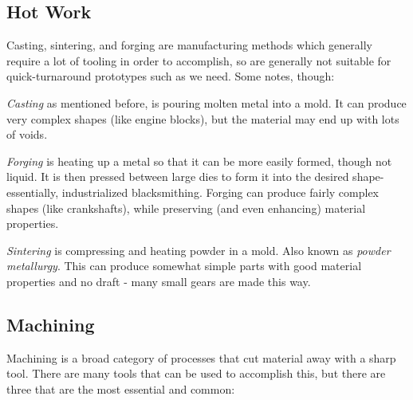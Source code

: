  \subsection{Hot Work}
 
 Casting, sintering, and forging are manufacturing methods which generally require a lot of tooling in order to accomplish, so are generally not suitable for quick-turnaround prototypes such as we need. Some notes, though:
 
 \begin{asparaitem}
 	\item \textit{Casting} as mentioned before, is pouring molten metal into a mold. It can produce very complex shapes (like engine blocks), but the material may end up with lots of voids.
 	\item \textit{Forging} is heating up a metal so that it can be more easily formed, though not liquid. It is then pressed between large dies to form it into the desired shape- essentially, industrialized blacksmithing. Forging can produce fairly complex shapes (like crankshafts), while preserving (and even enhancing) material properties.
 	\item \textit{Sintering} is compressing and heating powder in a mold. Also known as \textit{powder metallurgy}. This can produce somewhat simple parts with good material properties and no draft - many small gears are made this way.
 \end{asparaitem}
 
 \subsection{Machining}
 Machining is a broad category of processes that cut material away with a sharp tool. There are many tools that can be used to accomplish this, but there are three that are the most essential and common:
 
